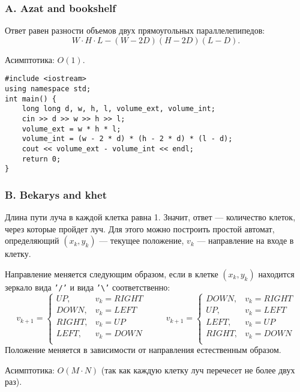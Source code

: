 \subsubsection*{A. Azat and bookshelf}

Ответ равен разности объемов двух прямоугольных параллелепипедов:
$$W \cdot H \cdot L - (W - 2 D) (H - 2 D) (L - D).$$

Асимптотика: $O(1)$. 

\begin{lstlisting}
#include <iostream>
using namespace std;
int main() {
    long long d, w, h, l, volume_ext, volume_int;
    cin >> d >> w >> h >> l;
    volume_ext = w * h * l;
    volume_int = (w - 2 * d) * (h - 2 * d) * (l - d);
    cout << volume_ext - volume_int << endl;
    return 0;
}
\end{lstlisting}



\subsubsection*{B. Bekarys and khet}

Длина пути луча в каждой клетка равна 1. Значит, ответ --- количество клеток, через которые пройдет луч. Для этого можно построить простой автомат, определяющий $(x_k, y_k)$ --- текущее положение, $v_k$ --- направление на входе в клетку. 

Направление меняется следующим образом, если в клетке $(x_k, y_k)$ находится зеркало вида {\tt '/'} и вида {\tt '\textbackslash'} соответственно:
$$
v_{k+1} =
\begin{cases}
UP, & v_k = RIGHT \\
DOWN, & v_k = LEFT \\
RIGHT, & v_k = UP \\
LEFT, & v_k = DOWN \\
\end{cases}
\hspace{1cm}
v_{k+1} =
\begin{cases}
DOWN, & v_k = RIGHT \\
UP, & v_k = LEFT \\
LEFT, & v_k = UP \\
RIGHT, & v_k = DOWN \\
\end{cases}
$$
Положение меняется в зависимости от направления естественным образом.

Асимптотика: $O(M \cdot N)$ (так как каждую клетку луч перечесет не более двух раз). 

